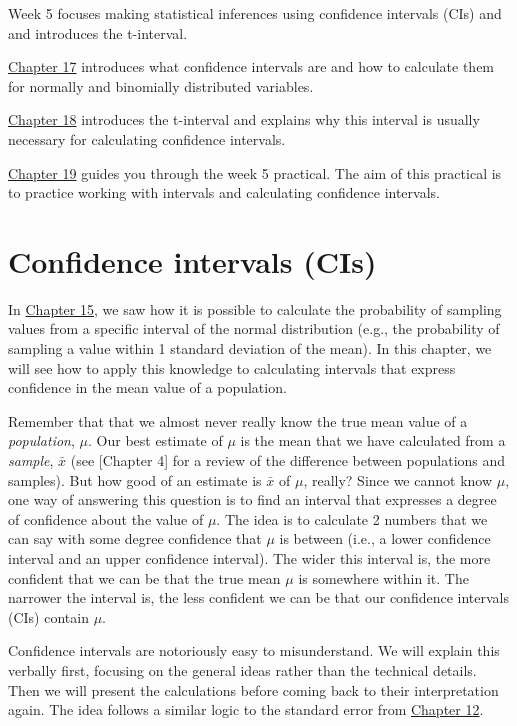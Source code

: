 \documentclass[
]{scrbook}
\begin{document}
Week 5 focuses making statistical inferences using confidence intervals (CIs) and and introduces the t-interval.

\protect\hyperlink{Chapter_17}{Chapter 17} introduces what confidence intervals are and how to calculate them for normally and binomially distributed variables.

\protect\hyperlink{Chapter_18}{Chapter 18} introduces the t-interval and explains why this interval is usually necessary for calculating confidence intervals.

\protect\hyperlink{Chapter_19}{Chapter 19} guides you through the week 5 practical.
The aim of this practical is to practice working with intervals and calculating confidence intervals.

\hypertarget{Chapter_17}{%
\chapter{Confidence intervals (CIs)}\label{Chapter_17}}

In \protect\hyperlink{Chapter_15}{Chapter 15}, we saw how it is possible to calculate the probability of sampling values from a specific interval of the normal distribution (e.g., the probability of sampling a value within 1 standard deviation of the mean).
In this chapter, we will see how to apply this knowledge to calculating intervals that express confidence in the mean value of a population.

Remember that that we almost never really know the true mean value of a \emph{population}, \(\mu\).
Our best estimate of \(\mu\) is the mean that we have calculated from a \emph{sample}, \(\bar{x}\) (see {[}Chapter 4{]} for a review of the difference between populations and samples).
But how good of an estimate is \(\bar{x}\) of \(\mu\), really?
Since we cannot know \(\mu\), one way of answering this question is to find an interval that expresses a degree of confidence about the value of \(\mu\).
The idea is to calculate 2 numbers that we can say with some degree confidence that \(\mu\) is between (i.e., a lower confidence interval and an upper confidence interval).
The wider this interval is, the more confident that we can be that the true mean \(\mu\) is somewhere within it.
The narrower the interval is, the less confident we can be that our confidence intervals (CIs) contain \(\mu\).

Confidence intervals are notoriously easy to misunderstand.
We will explain this verbally first, focusing on the general ideas rather than the technical details.
Then we will present the calculations before coming back to their interpretation again.
The idea follows a similar logic to the standard error from \protect\hyperlink{Chapter_12}{Chapter 12}.
\end{document}
